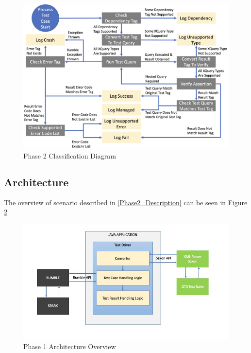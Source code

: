 \begin{figure}[h!]
	\vspace*{-3mm}
	\includegraphics[width=\linewidth]{error_code.png}
	\caption{Phase 2 Classification Diagram}
	\vspace*{-5mm}
	\label{fig:Phase2_ErrorCodes}
\end{figure}

\subsection{Architecture}
The overview of scenario described in \ref{Phase2_Description} can be seen in Figure \ref{fig:Phase2_Architecture}
\begin{figure}[h!]
	\vspace*{-5mm}
	\includegraphics[width=\linewidth]{architecture_diagram_phase_2.jpg}
	\vspace*{-15mm}
	\caption{Phase 1 Architecture Overview}
	\label{fig:Phase2_Architecture}
\end{figure}

